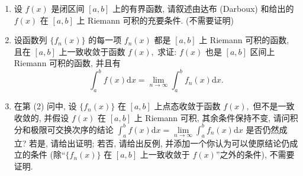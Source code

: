 \begin{question}[points = 12]
\begin{enumerate}
\item 设 $f(x)$ 是闭区间 $[a, b]$ 上的有界函数, 请叙述由达布 (Darboux) 和给出的 $f(x)$ 在 $[a, b]$ 上 Riemann 可积的充要条件. (不需要证明)
\item 设函数列 $\{f_n(x)\}$ 的每一项 $f_n(x)$ 都是 $[a, b]$ 上 Riemann 可积的函数, 且在 $[a, b]$ 上一致收敛于函数 $f(x),$ 求证: $f(x)$ 也是 $[a, b]$ 区间上 Riemann 可积的函数, 并且有
\[\int_a^b f(x) \mathrm{d} x = \lim\limits_{n\to\infty} \int_a^b f_n(x) \mathrm{d} x.\]
\item 在第 (2) 问中, 设 $\{f_n(x)\}$ 在 $[a, b]$ 上点态收敛于函数 $f(x),$ 但不是一致收敛的, 并假设 $f(x)$ 在 $[a, b]$ 上 Riemann 可积, 其余条件保持不变, 请问积分和极限可交换次序的结论 $\int_a^b f(x) \mathrm{d} x = \lim\limits_{n\to\infty} \int_a^b f_n(x) \mathrm{d} x$ 是否仍然成立? 若是, 请给出证明; 若否, 请给出反例, 并添加一个你认为可以使原结论仍成立的条件 (除“$\{f_n(x)\}$ 在 $[a, b]$ 上一致收敛于 $f(x)$”之外的条件), 不需要证明.
\end{enumerate}

\end{question}

